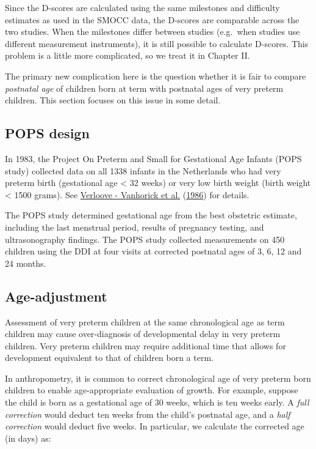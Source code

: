 \documentclass[
]{book}
\begin{document}
Since the D-scores are calculated using the same milestones and difficulty estimates as used in the SMOCC data, the D-scores are comparable across the two studies. When the milestones differ between studies (e.g.~when studies use different measurement instruments), it is still possible to calculate D-scores. This problem is a little more complicated, so we treat it in Chapter II.

The primary new complication here is the question whether it is fair to compare \emph{postnatal age} of children born at term with postnatal ages of very preterm children. This section focuses on this issue in some detail.

\hypertarget{pops-design}{%
\subsection{POPS design}\label{pops-design}}

In 1983, the Project On Preterm and Small for Gestational Age Infants (POPS study) collected data on all 1338 infants in the Netherlands who had very preterm birth (gestational age \textless{} 32 weeks) or very low birth weight (birth weight \textless{} 1500 grams). See \protect\hyperlink{ref-verloove1986}{Verloove - Vanhorick et al.} (\protect\hyperlink{ref-verloove1986}{1986}) for details.

The POPS study determined gestational age from the best obstetric estimate, including the last menstrual period, results of pregnancy testing, and ultrasonography findings. The POPS study collected measurements on 450 children using the DDI at four visits at corrected postnatal ages of 3, 6, 12 and 24 months.

\hypertarget{age-adjustment}{%
\subsection{Age-adjustment}\label{age-adjustment}}

Assessment of very preterm children at the same chronological age as term children may cause over-diagnosis of developmental delay in very preterm children. Very preterm children may require additional time that allows for development equivalent to that of children born a term.

In anthropometry, it is common to correct chronological age of very preterm born children to enable age-appropriate evaluation of growth. For example, suppose the child is born as a gestational age of 30 weeks, which is ten weeks early. A \emph{full correction} would deduct ten weeks from the child's postnatal age, and a \emph{half correction} would deduct five weeks. In particular, we calculate the corrected age (in days) as:
\end{document}
